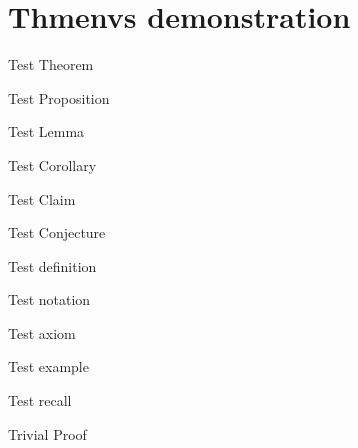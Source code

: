 \documentclass{article}
\begin{document}
\section{Thmenvs demonstration}

\begin{theorem}
Test Theorem
\end{theorem}
\begin{proposition}
Test Proposition
\end{proposition}
\begin{lemma}
Test Lemma
\end{lemma}
\begin{corollary}
Test Corollary
\end{corollary}
\begin{claim}
Test Claim
\end{claim}
\begin{conjecture}
Test Conjecture
\end{conjecture}

\begin{definition}
Test definition
\end{definition}
\begin{notation}
    Test notation
\end{notation}
\begin{axiom}
    Test axiom
\end{axiom}
\begin{example}
    Test example
\end{example}
\begin{recall}
    Test recall
\end{recall}

\begin{trivialproof}
    Trivial Proof
\end{trivialproof}
\end{document}
